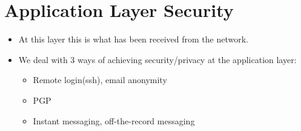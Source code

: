 \documentclass{article}
\begin{document}
\section{Application Layer Security}
\begin{itemize}
    \item At this layer this is what has been received from the network.
    \item We deal with 3 ways of achieving security/privacy at the application layer:
        \begin{itemize}
            \item Remote login(ssh), email anonymity
            \item PGP
            \item Instant messaging, off-the-record messaging
        \end{itemize}
\end{itemize}
\end{document}

